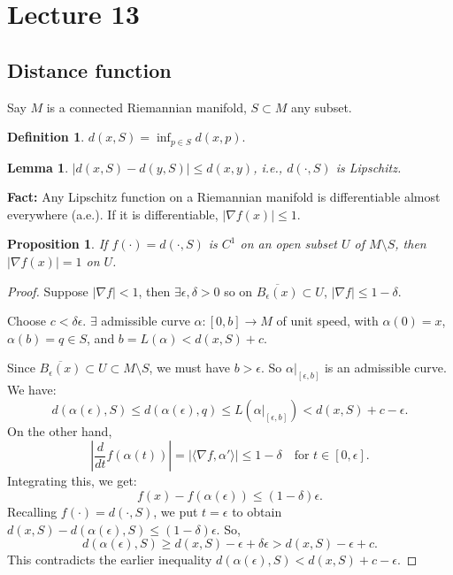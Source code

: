 \documentclass[11pt, a4paper]{article}
\theoremstyle{plain}
\newtheorem{lemma}[theorem]{Lemma}
\newtheorem{proposition}[theorem]{Proposition}
\theoremstyle{definition}
\newtheorem{definition}[theorem]{Definition}
\theoremstyle{remark}
\begin{document}
\newpage
{

\section{Lecture 13}
\subsection{Distance function}
Say $M$ is a connected Riemannian manifold, $S \subset M$ any subset.

\begin{definition}
$d(x, S) = \inf_{p \in S} d(x, p)$.
\end{definition}

\begin{lemma}
$|d(x, S) - d(y, S)| \le d(x, y)$, i.e., $d(\cdot, S)$ is Lipschitz.
\end{lemma}

\noindent\textbf{Fact:}
Any Lipschitz function on a Riemannian manifold is differentiable almost everywhere (a.e.). If it is differentiable, $|\nabla f(x)| \le 1$.


\begin{proposition}
If $f(\cdot) = d(\cdot, S)$ is $C^1$ on an open subset $U$ of $M \setminus S$, then $|\nabla f(x)| = 1$ on $U$.
\end{proposition}

\begin{proof}
Suppose $|\nabla f| < 1$, then $\exists \epsilon, \delta > 0$ so on $\overline{B_\epsilon(x)} \subset U$, $|\nabla f| \le 1 - \delta$.

Choose $c < \delta \epsilon$. $\exists$ admissible curve $\alpha: [0, b] \to M$ of unit speed, with $\alpha(0) = x$, $\alpha(b) = q \in S$, and $b = L(\alpha) < d(x, S) + c$.

Since $\overline{B_\epsilon(x)} \subset U \subset M \setminus S$, we must have $b > \epsilon$. So $\alpha|_{[\epsilon, b]}$ is an admissible curve.
We have:
\[
d(\alpha(\epsilon), S) \le d(\alpha(\epsilon), q) \le L(\alpha|_{[\epsilon, b]}) < d(x, S) + c - \epsilon.
\]
On the other hand,
\[
\left| \frac{d}{dt} f(\alpha(t)) \right| = |\langle \nabla f, \alpha' \rangle| \le 1 - \delta \quad \text{for } t \in [0, \epsilon].
\]
Integrating this, we get:
\[
f(x) - f(\alpha(\epsilon)) \le (1 - \delta)\epsilon.
\]
Recalling $f(\cdot) = d(\cdot, S)$, we put $t = \epsilon$ to obtain $d(x, S) - d(\alpha(\epsilon), S) \le (1 - \delta)\epsilon$.
So,
\[
d(\alpha(\epsilon), S) \ge d(x, S) - \epsilon + \delta \epsilon > d(x, S) - \epsilon + c.
\]
This contradicts the earlier inequality $d(\alpha(\epsilon), S) < d(x, S) + c - \epsilon$.
\end{proof}

}
\end{document}
